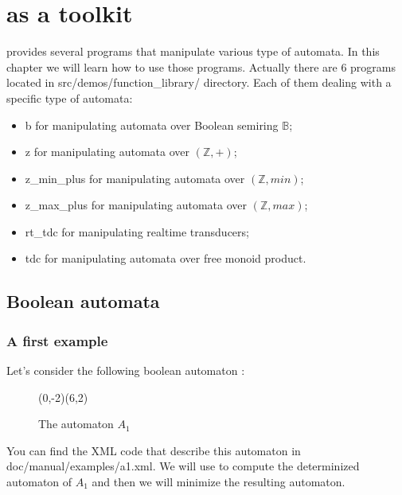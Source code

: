 \chapter{\Vauc as a toolkit}

\Vauc provides several programs that manipulate various type of
automata. In this chapter we will learn
how to use those programs. Actually there are 6 programs
located in src/demos/function\_library/ directory. Each of them
dealing with a specific type of automata:


\begin{itemize}
  \item b for manipulating automata over Boolean semiring $\mathbb{B}$;
  \item z for manipulating automata over $(\mathbb{Z},+)$;
  \item z\_min\_plus for manipulating automata over $(\mathbb{Z},min)$;
  \item z\_max\_plus for manipulating automata over $(\mathbb{Z},max)$;
  \item rt\_tdc for manipulating realtime transducers;
  \item tdc for manipulating automata over free monoid product.
\end{itemize}


\section{Boolean automata}

\subsection{A first example}

Let's consider the following boolean automaton :

\begin{figure}[ht] \centering
  \begin{VCPicture}{(0,-2)(6,2)}
      
     
     
       
  \end{VCPicture}
  \caption{The automaton $A_1$}
\end{figure}

You can find the XML code that describe this automaton in
doc/manual/examples/a1.xml.
We will use \Vauc to compute the determinized automaton of $A_1$ and
then we will minimize the resulting automaton.

